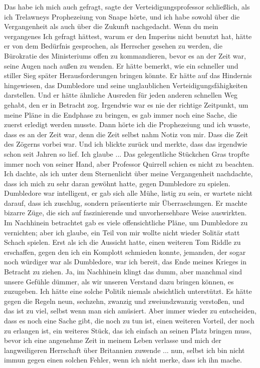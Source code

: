 \glqq{}Das habe ich mich auch gefragt\grqq{}, sagte der Verteidigungsprofessor
schließlich, \glqq{}als ich Trelawneys Prophezeiung von Snape hörte, und ich habe
sowohl über die Vergangenheit als auch über die Zukunft nachgedacht. Wenn du
mein vergangenes Ich gefragt hättest, warum er den Imperius nicht benutzt hat,
hätte er von dem Bedürfnis gesprochen, als Herrscher gesehen zu werden, die
Bürokratie des Ministeriums offen zu kommandieren, bevor es an der Zeit war,
seine Augen nach außen zu wenden. Er hätte bemerkt, wie ein schneller und
stiller Sieg später Herausforderungen bringen könnte. Er hätte auf das Hindernis
hingewiesen, das Dumbledore und seine unglaublichen Verteidigungsfähigkeiten
darstellen. Und er hätte ähnliche Ausreden für jeden anderen schnellen Weg
gehabt, den er in Betracht zog. Irgendwie war es nie der richtige Zeitpunkt, um
meine Pläne in die Endphase zu bringen, es gab immer noch eine Sache, die zuerst
erledigt werden musste. Dann hörte ich die Prophezeiung und ich wusste, dass es
an der Zeit war, denn die Zeit selbst nahm Notiz von mir. Dass die Zeit des
Zögerns vorbei war. Und ich blickte zurück und merkte, dass das irgendwie schon
seit Jahren so lief. Ich glaube ...\grqq{} Das gelegentliche Stückchen Gras tropfte
immer noch von seiner Hand, aber Professor Quirrell schien es nicht zu beachten.
\glqq{}Ich dachte, als ich unter dem Sternenlicht über meine Vergangenheit
nachdachte, dass ich mich zu sehr daran gewöhnt hatte, gegen Dumbledore zu
spielen. Dumbledore war intelligent, er gab sich alle Mühe, listig zu sein, er
wartete nicht darauf, dass ich zuschlug, sondern präsentierte mir
Überraschungen. Er machte bizarre Züge, die sich auf faszinierende und
unvorhersehbare Weise auswirkten. Im Nachhinein betrachtet gab es viele
offensichtliche Pläne, um Dumbledore zu vernichten; aber ich glaube, ein Teil
von mir wollte nicht wieder Solitär statt Schach spielen. Erst als ich die
Aussicht hatte, einen weiteren Tom Riddle zu erschaffen, gegen den ich ein
Komplott schmieden konnte, jemanden, der sogar noch würdiger war als Dumbledore,
war ich bereit, das Ende meines Krieges in Betracht zu ziehen. Ja, im Nachhinein
klingt das dumm, aber manchmal sind unsere Gefühle dümmer, als wir unseren
Verstand dazu bringen können, es zuzugeben. Ich hätte eine solche Politik
niemals absichtlich unterstützt. Es hätte gegen die Regeln neun, sechzehn,
zwanzig und zweiundzwanzig verstoßen, und das ist zu viel, selbst wenn man sich
amüsiert. Aber immer wieder zu entscheiden, dass es noch eine Sache gibt, die
noch zu tun ist, einen weiteren Vorteil, der noch zu erlangen ist, ein weiteres
Stück, das ich einfach an seinen Platz bringen muss, bevor ich eine angenehme
Zeit in meinem Leben verlasse und mich der langweiligeren Herrschaft über
Britannien zuwende ... nun, selbst ich bin nicht immun gegen einen solchen
Fehler, wenn ich nicht merke, dass ich ihn mache.\grqq{}

